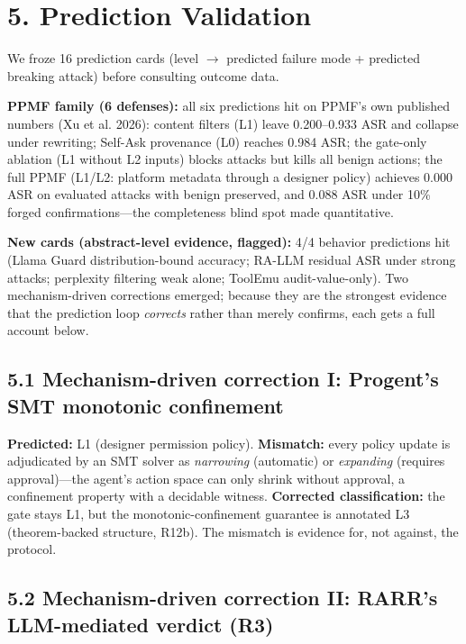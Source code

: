 \documentclass[11pt]{article}
\begin{document}
\section{5. Prediction Validation}\label{prediction-validation}

We froze 16 prediction cards (level $\rightarrow$ predicted failure mode + predicted breaking attack) before consulting outcome data.

\textbf{PPMF family (6 defenses):} all six predictions hit on PPMF's own published numbers (Xu et al. 2026): content filters (L1) leave 0.200--0.933 ASR and collapse under rewriting; Self-Ask provenance (L0) reaches 0.984 ASR; the gate-only ablation (L1 without L2 inputs) blocks attacks but kills all benign actions; the full PPMF (L1/L2: platform metadata through a designer policy) achieves 0.000 ASR on evaluated attacks with benign preserved, and 0.088 ASR under 10\% forged confirmations---the completeness blind spot made quantitative.

\textbf{New cards (abstract-level evidence, flagged):} 4/4 behavior predictions hit (Llama Guard distribution-bound accuracy; RA-LLM residual ASR under strong attacks; perplexity filtering weak alone; ToolEmu audit-value-only). Two mechanism-driven corrections emerged; because they are the strongest evidence that the prediction loop \emph{corrects} rather than merely confirms, each gets a full account below.

\subsection{5.1 Mechanism-driven correction I: Progent's SMT monotonic confinement}\label{mechanism-driven-correction-i-progents-smt-monotonic-confinement}

\textbf{Predicted:} L1 (designer permission policy). \textbf{Mismatch:} every policy update is adjudicated by an SMT solver as \emph{narrowing} (automatic) or \emph{expanding} (requires approval)---the agent's action space can only shrink without approval, a confinement property with a decidable witness. \textbf{Corrected classification:} the gate stays L1, but the monotonic-confinement guarantee is annotated L3 (theorem-backed structure, R12b). The mismatch is evidence for, not against, the protocol.

\subsection{5.2 Mechanism-driven correction II: RARR's LLM-mediated verdict (R3)}\label{mechanism-driven-correction-ii-rarrs-llm-mediated-verdict-r3}
\end{document}
